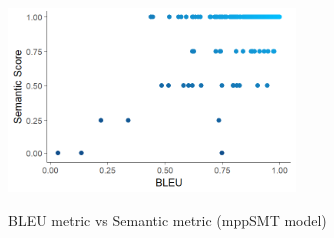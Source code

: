 \begin{figure}
\caption{BLEU metric vs Semantic metric (mppSMT model)}
\centering
\includegraphics[width=3in]{img/bleuvssemantic_mppSMT.png}
\label{fig:BleuSemMppSMT}
\end{figure}

